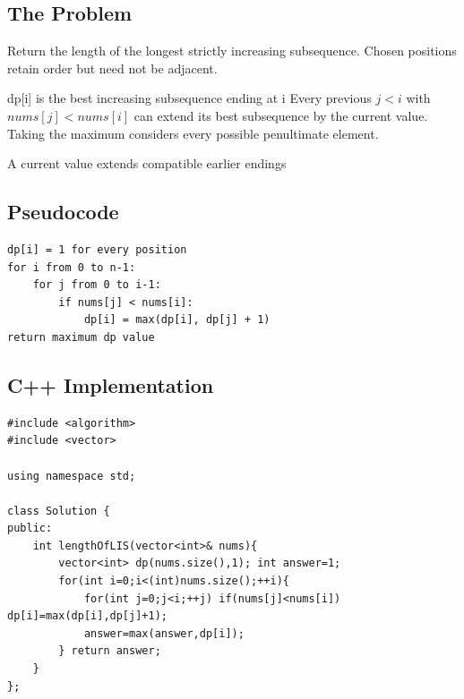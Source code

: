 \subsection{The Problem}
Return the length of the longest strictly increasing subsequence. Chosen
positions retain order but need not be adjacent.

\begin{invariantbox}{dp[i] is the best increasing subsequence ending at i}
Every previous \(j<i\) with \(nums[j]<nums[i]\) can extend its best
subsequence by the current value. Taking the maximum considers every possible
penultimate element.
\end{invariantbox}

\begin{visualbox}{A current value extends compatible earlier endings}
\centering
{}
\end{visualbox}

\subsection{Pseudocode}
\begin{lstlisting}[style=pseudocode]
dp[i] = 1 for every position
for i from 0 to n-1:
    for j from 0 to i-1:
        if nums[j] < nums[i]:
            dp[i] = max(dp[i], dp[j] + 1)
return maximum dp value
\end{lstlisting}

\subsection{C++ Implementation}
\begin{lstlisting}[style=compactcode,caption={Complete C++ solution: Longest Increasing Subsequence}]
#include <algorithm>
#include <vector>

using namespace std;

class Solution {
public:
    int lengthOfLIS(vector<int>& nums){
        vector<int> dp(nums.size(),1); int answer=1;
        for(int i=0;i<(int)nums.size();++i){
            for(int j=0;j<i;++j) if(nums[j]<nums[i]) dp[i]=max(dp[i],dp[j]+1);
            answer=max(answer,dp[i]);
        } return answer;
    }
};
\end{lstlisting}

